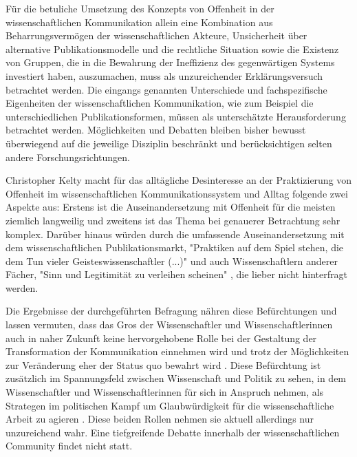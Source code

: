 Für die betuliche Umsetzung des Konzepts von Offenheit in der wissenschaftlichen Kommunikation allein eine Kombination aus Beharrungsvermögen der wissenschaftlichen Akteure, Unsicherheit über alternative Publikationsmodelle und die rechtliche Situation sowie die Existenz von Gruppen, die in die Bewahrung der Ineffizienz des gegenwärtigen Systems investiert haben, auszumachen, muss als unzureichender Erklärungsversuch betrachtet werden. Die eingangs genannten Unterschiede und fachspezifische Eigenheiten der wissenschaftlichen Kommunikation, wie zum Beispiel die unterschiedlichen Publikationsformen, müssen als unterschätzte Herausforderung betrachtet werden. Möglichkeiten und Debatten bleiben bisher bewusst überwiegend auf die jeweilige Disziplin beschränkt und berücksichtigen selten andere Forschungsrichtungen.

Christopher Kelty macht für das alltägliche Desinteresse an der Praktizierung von Offenheit im wissenschaftlichen Kommunikationssystem und Alltag folgende zwei Aspekte aus: Erstens ist die Auseinandersetzung mit Offenheit für die meisten ziemlich langweilig und zweitens ist das Thema bei genauerer Betrachtung sehr komplex. Darüber hinaus würden durch die umfassende Auseinandersetzung mit dem wissenschaftlichen Publikationsmarkt, "Praktiken auf dem Spiel stehen, die dem Tun vieler Geisteswissenschaftler (...)" und auch Wissenschaftlern anderer Fächer, "Sinn und Legitimität zu verleihen scheinen" \cite{Hirschi_2015}, die lieber nicht hinterfragt werden.

Die Ergebnisse der durchgeführten Befragung nähren diese Befürchtungen und lassen vermuten, dass das Gros der Wissenschaftler und Wissenschaftlerinnen auch in naher Zukunft keine hervorgehobene Rolle bei der Gestaltung der Transformation der Kommunikation einnehmen wird und trotz der Möglichkeiten zur Veränderung eher der Status quo bewahrt wird \cite{nosek_2012_scientific}. Diese Befürchtung ist zusätzlich im Spannungsfeld zwischen Wissenschaft und Politik zu sehen, in dem Wissenschaftler und Wissenschaftlerinnen für sich in Anspruch nehmen, als Strategen im politischen Kampf um Glaubwürdigkeit für die wissenschaftliche Arbeit zu agieren \cite{latour_2013_laboratory}. Diese beiden Rollen nehmen sie aktuell allerdings nur unzureichend wahr. Eine tiefgreifende Debatte innerhalb der wissenschaftlichen Community findet nicht statt.

